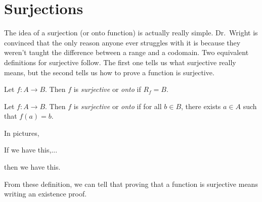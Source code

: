 \section{Surjections}

The idea of a surjection (or onto function) is actually really simple.  Dr.~Wright is convinced that the only reason anyone ever struggles with it is because they weren't taught the difference between a range and a codomain.  Two equivalent definitions for surjective follow.  The first one tells us what surjective really means, but the second tells us how to prove a function is surjective.
\begin{definition}  Let $f: A \to B$.  Then $f$ is \textit{surjective} or \textit{onto} if $R_f = B$.
\end{definition}

\begin{definition}  Let $f: A \to B$.  Then $f$ is \textit{surjective} or \textit{onto} if for all $b \in B$, there exists $a\in A$ such that $f(a)=b$.
\end{definition}

In pictures,
\begin{multicols}{2}
If we have this,...\\


then we have this.\\

\end{multicols}

From these definition, we can tell that proving that a function is surjective means writing an existence proof.

